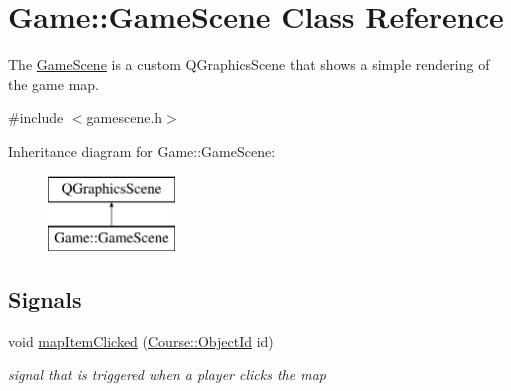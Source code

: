 \hypertarget{classGame_1_1GameScene}{\section{Game\-:\-:Game\-Scene Class Reference}
\label{classGame_1_1GameScene}
}


The \hyperlink{classGame_1_1GameScene}{Game\-Scene} is a custom Q\-Graphics\-Scene that shows a simple rendering of the game map.  




{\ttfamily \#include $<$gamescene.\-h$>$}

Inheritance diagram for Game\-:\-:Game\-Scene\-:\begin{figure}[H]
\begin{center}
\leavevmode
\includegraphics[height=2.000000cm]{classGame_1_1GameScene}
\end{center}
\end{figure}
\subsection*{Signals}
\begin{DoxyCompactItemize}
\item 
void \hyperlink{classGame_1_1GameScene_a9eafcdc42ec8c53bf01afb54c0a71316}{map\-Item\-Clicked} (\hyperlink{namespaceCourse_a9a16e743c9813da00109e4991afd2f3e}{Course\-::\-Object\-Id} id)
\begin{DoxyCompactList}\small\item\em signal that is triggered when a player clicks the map \end{DoxyCompactList}\end{DoxyCompactItemize}
